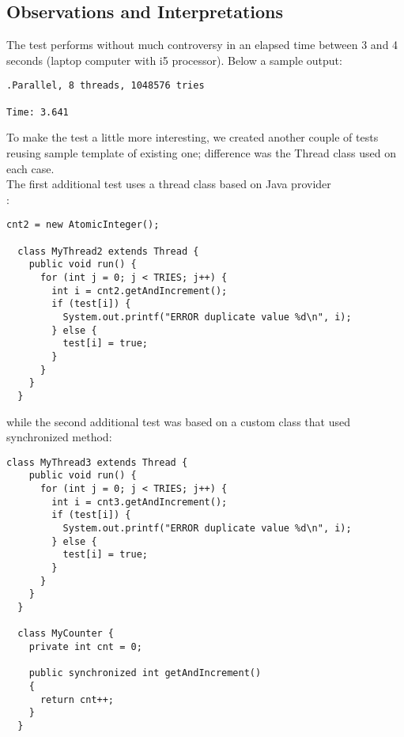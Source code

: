 \subsection{Observations and Interpretations}

The test performs without much controversy in an elapsed time between
3 and 4 seconds (laptop computer with i5 processor). Below a sample
output: 

\begin{verbatim}
.Parallel, 8 threads, 1048576 tries

Time: 3.641
\end{verbatim}

To make the test a little more interesting, we created another couple
of tests reusing sample template of existing one; difference was the
Thread class used on each case. \\

The first additional test uses a thread class based on Java provider \\
: \\

\begin{lstlisting}[style=nonumbers]
  cnt2 = new AtomicInteger();

  class MyThread2 extends Thread {
    public void run() {
      for (int j = 0; j < TRIES; j++) {
        int i = cnt2.getAndIncrement();
        if (test[i]) {
          System.out.printf("ERROR duplicate value %d\n", i);
        } else {
          test[i] = true;
        }
      }
    }        
  }
\end{lstlisting}
\hfill

while the second additional test was based on a custom class that used
synchronized  method:\\

\begin{lstlisting}[style=nonumbers]
  class MyThread3 extends Thread {
    public void run() {
      for (int j = 0; j < TRIES; j++) {
        int i = cnt3.getAndIncrement();
        if (test[i]) {
          System.out.printf("ERROR duplicate value %d\n", i);
        } else {
          test[i] = true;
        }
      }
    }        
  }

  class MyCounter {
    private int cnt = 0;

    public synchronized int getAndIncrement()
    {
      return cnt++;
    }
  }
\end{lstlisting}
\hfill


